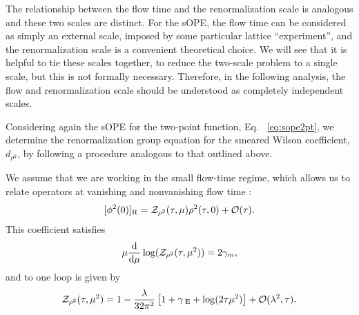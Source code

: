 The relationship between the flow time and the renormalization scale is 
analogous and these two scales are distinct. For the sOPE, the flow time can be 
considered as simply an external scale, imposed by some particular lattice 
``experiment'', and the renormalization scale is a convenient theoretical 
choice. We will see that it is helpful to tie these scales 
together, to reduce the two-scale problem to a single scale, but this is not 
formally necessary. Therefore, in the following analysis, the flow and 
renormalization scale should be understood as completely independent scales.

Considering again the sOPE for the two-point function, Eq.~
\eqref{eq:sope2pt},
we determine the renormalization group equation for the smeared Wilson 
coefficient, 
$d_{\rho^2}$, by following a procedure analogous to that outlined above. 

We assume that we are working in the small flow-time regime, which allows us 
to relate 
operators at vanishing and nonvanishing flow time 
\cite{Makino:2014taa,Suzuki:2013gza,Luscher:2011bx}:
\begin{equation}\label{eq:smallt}
[\phi^2(0)]_{\mathrm{R}}  =   {\cal 
Z}_{\rho^2}(\tau,\mu)\rho^2(\tau,0) + {\cal O}(\tau).
\end{equation}
This coefficient satisfies
\begin{equation}\label{eq:zgamma}
\mu\frac{\mathrm{d}}{\mathrm{d}\mu}\log({\cal 
Z}_{\rho^2}(\tau,\mu^2)) = 2\gamma_m,
\end{equation}
and to one loop is given by
\begin{equation}
{\cal Z}_{\rho^2}(\tau,\mu^2)= 
1-\frac{\lambda}{32\pi^2}\left[1+\gamma_{\;\mathrm{E}}+\log(2\tau 
\mu^2)\right]+{\cal 
O}(\lambda^2,\tau).
\end{equation}

